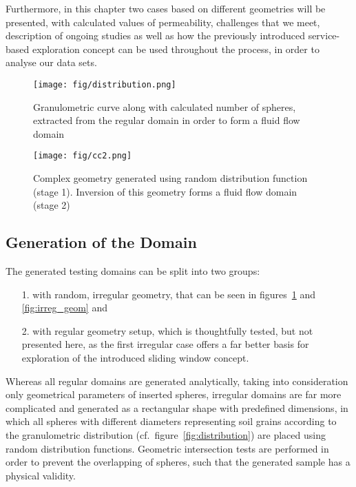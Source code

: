 \documentclass[10pt, conference]{IEEEtran}
\newcommand{\TODO}[1]{\textcolor{red}{{\bf TODO}: #1}}
\begin{document}
Furthermore, in this chapter two cases based on different geometries will be presented, with calculated values of permeability, challenges that we meet, description of ongoing studies as well as
how the previously introduced service-based exploration concept can be used throughout the process, in order to analyse our data sets.

\begin{figure}[!bt]
\centering
\texttt{[image: fig/distribution.png]}
\caption{Granulometric curve along with calculated number of spheres, extracted from the regular domain in order to form a fluid flow domain}
\label{fig:distribution}

\vspace{0.6cm}

\texttt{[image: fig/cc2.png]}
\caption{Complex geometry generated using random distribution function (stage 1). Inversion of this geometry forms a fluid flow domain (stage 2) }
\label{fig:cc2}
\end{figure}

\subsection{Generation of the Domain}

The generated testing domains can be split into two groups: 
\begin{itemize}
\item[1.] with random, irregular geometry, that can be seen in figures~\ref{fig:cc2} and \ref{fig:irreg_geom} and
\item[2.] with regular geometry setup, which is thoughtfully tested, but not presented here, as the first irregular case offers a far better basis for exploration of the introduced sliding window concept. 
\end{itemize}
Whereas all regular domains are generated analytically, taking into consideration only geometrical parameters of inserted spheres, irregular domains are far more complicated and generated
as a rectangular shape with predefined dimensions, in which all spheres with different diameters representing soil grains according to the granulometric distribution (cf.\
figure~\ref{fig:distribution}) are placed using random distribution functions. Geometric intersection tests are performed in order to prevent the overlapping of spheres, such that the generated
sample has a physical validity.
\end{document}
